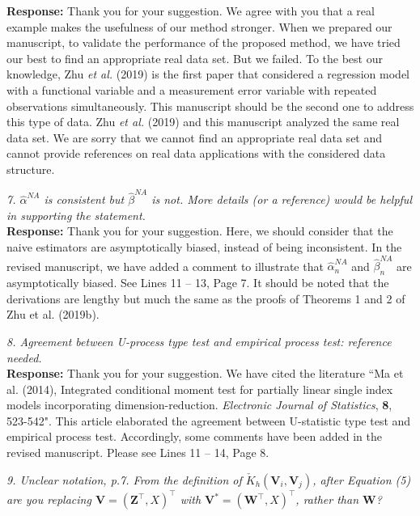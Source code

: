 \documentclass[12pt]{report}
\begin{document}
\begin{description}
{\bf Response: } Thank you for your suggestion. We agree with you that  a real example makes the usefulness of our method stronger. When we prepared our manuscript, to validate the performance of the proposed method, we have tried our best to find an appropriate real data set. But we failed.  To the best our knowledge, Zhu \emph{et al.} (2019) is the first paper that considered a regression model with a functional variable and  a measurement error  variable with  repeated observations simultaneously.  This manuscript should be the second one to address  this type of data. Zhu \emph{et al.} (2019) and this manuscript analyzed the same real data set.  We are sorry that we cannot find an appropriate real data set and cannot provide references on real data applications with the considered data structure.   \\

\item {{ \textcolor[rgb]{0.00,0.50,1.00}{\em 7. $\hat{\alpha}^{NA}$ is consistent but  $\hat{\beta}^{NA}$ is not. More details (or a reference) would be helpful in supporting
the statement. }} \\

 \bf Response: } Thank you for your suggestion. Here, we  should  consider that the naive estimators are asymptotically biased, instead of being inconsistent.  In the revised manuscript, we have added a comment to
illustrate  that  $\hat{\alpha}^{NA}_n$  and $\hat{\beta}_n^{NA}$ are asymptotically biased.  See Lines 11 -- 13, Page 7.  It should be noted that the derivations  are  lengthy but much the same as the  proofs of Theorems 1 and 2 of  Zhu et al. (2019b).\\

\item {{ \textcolor[rgb]{0.00,0.50,1.00}{\em 8.  Agreement between U-process type test and empirical process test: reference needed.}}}\\

{ \bf Response: } Thank you for your suggestion. We have cited the literature ``Ma et al. (2014), Integrated conditional moment test for partially linear single index models incorporating dimension-reduction. {\it Electronic Journal of Statistics}, {\bf 8}, 523-542".  This article elaborated the agreement between U-statistic type test and empirical process test. Accordingly, some comments have been added in the revised manuscript. Please see Lines 11 -- 14, Page 8.\\

\item {{ \textcolor[rgb]{0.00,0.50,1.00}{\em 9.  Unclear notation, p.7. From the definition of $\check{K}_h(\mathbf{V}_i,\mathbf{V}_j)$, after Equation (5) are you replacing
$\mathbf{V}=(\mathbf{Z}^{\top},X)^{\top}$ with $\mathbf{V}^{*}=(\mathbf{W}^{\top},X)^{\top}$, rather than $\mathbf{W}$? }}}\\


\end{description}
\end{document}
